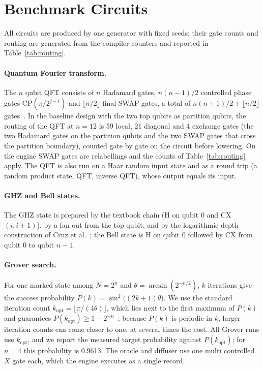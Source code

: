 \section{Benchmark Circuits}\label{sec:algorithms}

All circuits are produced by one generator with fixed seeds; their gate counts and routing are generated from the
compiler counters and reported in Table~\ref{tab:routing}.

\paragraph{Quantum Fourier transform.} The $n$ qubit QFT consists of $n$ Hadamard gates, $n(n-1)/2$ controlled phase
gates $\mathrm{CP}(\pi/2^{j-i})$ and $\lfloor n/2\rfloor$ final SWAP gates, a total of $n(n+1)/2 + \lfloor n/2\rfloor$
gates~\cite{nielsen2010quantum}. In the baseline design with the two top qubits as partition qubits, the routing of
the QFT at $n=12$ is 59 local, 21 diagonal and 4 exchange gates (the two Hadamard gates on the partition qubits and the
two SWAP gates that cross the partition boundary), counted gate by gate on the circuit before lowering. On the engine
SWAP gates are relabellings and the counts of Table~\ref{tab:routing} apply. The QFT is also run on a Haar random input state and as a round trip (a random
product state, QFT, inverse QFT), whose output equals its input.

\paragraph{GHZ and Bell states.} The GHZ state is prepared by the textbook chain (H on qubit 0 and CX$(i,i+1)$), by a
fan out from the top qubit, and by the logarithmic depth construction of Cruz et al.~\cite{cruz2019efficient};
the Bell state is H on qubit 0 followed by CX from qubit 0 to qubit $n-1$.

\paragraph{Grover search.} For one marked state among $N = 2^n$ and $\theta = \arcsin(2^{-n/2})$, $k$ iterations give
the success probability $P(k) = \sin^2\bigl((2k+1)\theta\bigr)$. We use the standard iteration count
$k_{\mathrm{opt}} = \lfloor \pi/(4\theta) \rfloor$, which lies next to the first maximum of $P(k)$ and guarantees
$P(k_{\mathrm{opt}}) \ge 1 - 2^{-n}$~\cite{boyer1998tight,grover1996fast}; because $P(k)$ is periodic in $k$, larger
iteration counts can come closer to one, at several times the cost. All Grover runs use $k_{\mathrm{opt}}$, and we
report the measured target probability against $P(k_{\mathrm{opt}})$; for $n=4$ this probability is 0.9613. The oracle
and diffuser use one multi controlled $X$ gate each, which the engine executes as a single record.

